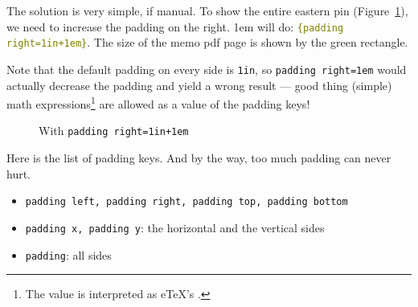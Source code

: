 \documentclass{article}
\begin{document}
The solution is very simple, if manual.  To show the entire eastern pin
(Figure~\ref{fig:with-padding}), we need to increase the padding on the right.
1em will do: \textcolor{olive}{\tt \string\memoizeset\{padding right=1in+1em\}}.  The size of
the memo pdf page is shown by the green rectangle.

Note that the default padding on every side is {\tt 1in}, so {\tt padding
  right=1em} would actually decrease the padding and yield a wrong result ---
good thing (simple) math expressions\footnote{The value is interpreted as
  e\TeX's {\tt\string\dimexpr}.} are allowed as a value of the padding keys!

{%
  \begin{figure}[b]
    \begin{center}
    \end{center}
    \caption{With {\tt padding right=1in+1em}}
    \label{fig:with-padding}
  \end{figure}
}

Here is the list of padding keys. And by the way, too much padding can never
hurt.
\begin{itemize}
\item {\tt padding left, padding right, padding top, padding bottom}
\item {\tt padding x, padding y}: the horizontal and the vertical sides
\item {\tt padding}: all sides
\end{itemize}
\end{document}
